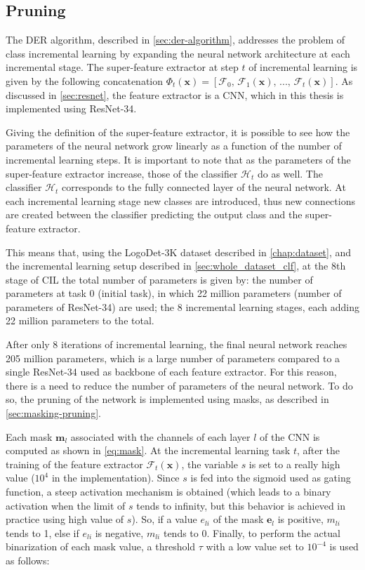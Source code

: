 \subsection{Pruning}
\label{sec:method-pruning}

The DER algorithm, described in \autoref{sec:der-algorithm}, addresses the problem of class incremental learning by expanding the neural network architecture at each incremental stage. The super-feature extractor at step $t$ of incremental learning is given by the following concatenation $\Phi_t(\mathbf{x}) = [\mathcal{F}_0, \, \mathcal{F}_1(\mathbf{x}), \, ..., \, \mathcal{F}_t(\mathbf{x})]$. As discussed in \autoref{sec:resnet}, the feature extractor is a CNN, which in this thesis is implemented using ResNet-34.

Giving the definition of the super-feature extractor, it is possible to see how the parameters of the neural network grow linearly as a function of the number of incremental learning steps.
It is important to note that as the parameters of the super-feature extractor increase, those of the classifier $\mathcal{H}_t$ do as well.
The classifier $\mathcal{H}_t$ corresponds to the fully connected layer of the neural network. At each incremental learning stage new classes are introduced, thus new connections are created between the classifier predicting the output class and the super-feature extractor.

This means that, using the LogoDet-3K dataset described in \autoref{chap:dataset}, and the incremental learning setup described in \autoref{sec:whole_dataset_clf}, at the 8th stage of CIL the total number of parameters is given by: the number of parameters at task 0 (initial task), in which 22 million parameters (number of parameters of ResNet-34) are used; the 8 incremental learning stages, each adding 22 million parameters to the total.

After only 8 iterations of incremental learning, the final neural network reaches 205 million parameters, which is a large number of parameters compared to a single ResNet-34 used as backbone of each feature extractor.
For this reason, there is a need to reduce the number of parameters of the neural network.
To do so, the pruning of the network is implemented using masks, as described in \autoref{sec:masking-pruning}.

Each mask $\mathbf{m}_l$ associated with the channels of each layer $l$ of the CNN is computed as shown in \autoref{eq:mask}.
At the incremental learning task $t$, after the training of the feature extractor $\mathcal{F}_t(\mathbf{x})$, the variable $s$ is set to a really high value ($10^{4}$ in the implementation).
Since $s$ is fed into the sigmoid used as gating function, a steep activation mechanism is obtained (which leads to a binary activation when the limit of $s$ tends to infinity, but this behavior is achieved in practice using high value of $s$).
So, if a value $e_{li}$ of the mask $\mathbf{e}_l$ is positive, $m_{li}$ tends to 1, else if $e_{li}$ is negative, $m_{li}$ tends to 0.
Finally, to perform the actual binarization of each mask value, a threshold $\tau$ with a low value set to $10^{-4}$ is used as follows:

